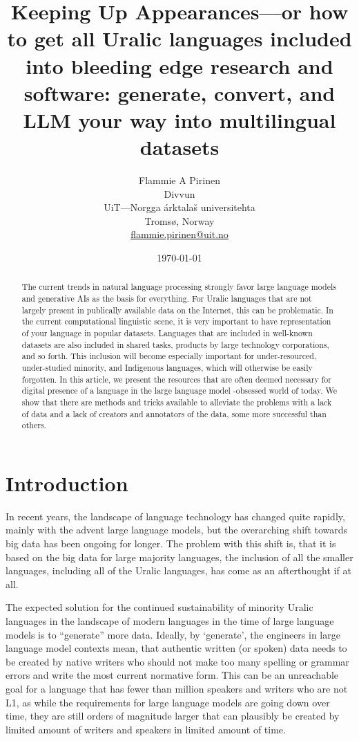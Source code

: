 \documentclass[free]{flammie}
\title{Keeping Up Appearances---or how to get all Uralic languages included into
bleeding edge research and software: generate, convert, and LLM your way into
multilingual
datasets\footnotepubrights{\aclanthologypostprintdoi{2024.iwclul-1.16}}}
\author{Flammie A Pirinen\\
Divvun\\
UiT---Norgga árktalaš universitehta\\
Tromsø, Norway\\
\url{flammie.pirinen@uit.no}}
\date{\today}
\begin{document}
\maketitle

\begin{abstract}
    The current trends in natural language processing strongly favor large
    language models and generative AIs as the basis for everything.  For Uralic
    languages that are not largely present in publically available data on the
    Internet, this can be problematic.  In the current computational linguistic
    scene, it is very important to have representation of your language in
    popular datasets.  Languages that are included in well-known datasets are
    also included in shared tasks, products by large technology corporations,
    and so forth.  This inclusion will become especially important for
    under-resourced, under-studied minority, and Indigenous languages, which
    will otherwise be easily forgotten.  In this article, we present the
    resources that are often deemed necessary for digital presence of a language
    in the large language model -obsessed world of today.  We show that there
    are methods and tricks available to alleviate the problems with a lack of
    data and a lack of creators and annotators of the data, some more successful
    than others.
\end{abstract}

\section{Introduction}

In recent years, the landscape of language technology has changed quite rapidly,
mainly with the advent large language models, but the overarching shift towards
big data has been ongoing for longer.  The problem with this shift is, that it
is based on the big data for large majority languages, the inclusion of all the
smaller languages, including all of the Uralic languages, has come as an
afterthought if at all.

The expected solution for the continued sustainability of minority Uralic
languages in the landscape of modern languages in the time of large language
models is to ``generate'' more data.  Ideally, by `generate', the engineers in
large language model contexts mean, that authentic written (or spoken) data
needs to be created by native writers who should not make too many spelling or
grammar errors and write the most current normative form.  This can be an
unreachable goal for a language that has fewer than million speakers and writers
who are not L1, as while the requirements for large language models are going
down over time, they are still orders of magnitude larger that can plausibly be
created by limited amount of writers and speakers in limited amount of time.
\end{document}
